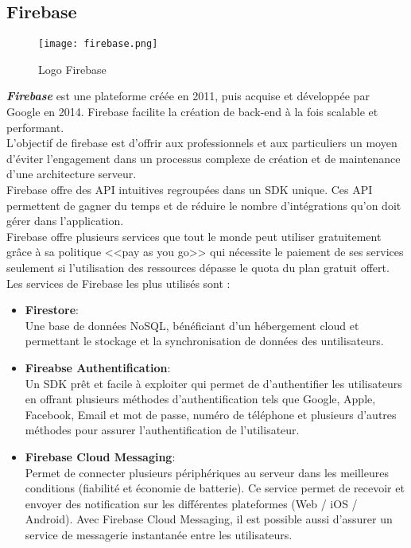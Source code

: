 \subsection{Firebase}
\vspace{1cm}
\begin{figure}[H]
    \centering
    \texttt{[image: firebase.png]}
    \vspace{1cm}
    \captionsetup{justification=centering}

    \caption{Logo Firebase}
    \label{fig:firebase_logo}
\end{figure}
\textit{\textbf{Firebase}} \cite{firebase} est une plateforme créée en 2011, puis acquise et développée par Google en 2014. Firebase facilite la création de back-end à la fois scalable et performant.\\
\noindent L'objectif de firebase est d'offrir aux professionnels et aux particuliers un moyen d'éviter l'engagement dans un processus complexe de création et de maintenance d'une architecture serveur.\\
\noindent Firebase offre des API intuitives regroupées dans un SDK unique. Ces API permettent de gagner du temps et de réduire le nombre d'intégrations qu'on doit gérer dans l'application.\\
\noindent Firebase offre plusieurs services que tout le monde peut utiliser gratuitement grâce à sa politique <<pay as you go>> qui nécessite le paiement de ses services seulement si l'utilisation des ressources dépasse le quota du plan gratuit offert. Les services de Firebase les plus utilisés sont :
\begin{itemize}
    \item \textbf{Firestore}:\\ Une base de données NoSQL, bénéficiant d'un hébergement cloud et permettant le stockage et la synchronisation de données des untilisateurs.
    \item \textbf{Fireabse Authentification}:\\ Un SDK prêt et facile à exploiter qui permet de d'authentifier les utilisateurs en offrant plusieurs méthodes d'authentification tels que Google, Apple, Facebook, Email et mot de passe, numéro de téléphone et plusieurs d'autres méthodes pour assurer l'authentification de l'utilisateur.
    \item \textbf{Firebase Cloud Messaging}:\\ Permet de connecter plusieurs périphériques au serveur dans les meilleures conditions (fiabilité et économie de batterie). Ce service permet de recevoir et envoyer des notification sur les différentes plateformes (Web / iOS / Android). Avec Firebase Cloud Messaging, il est possible aussi d'assurer un service de messagerie instantanée entre les utilisateurs.
\end{itemize}
